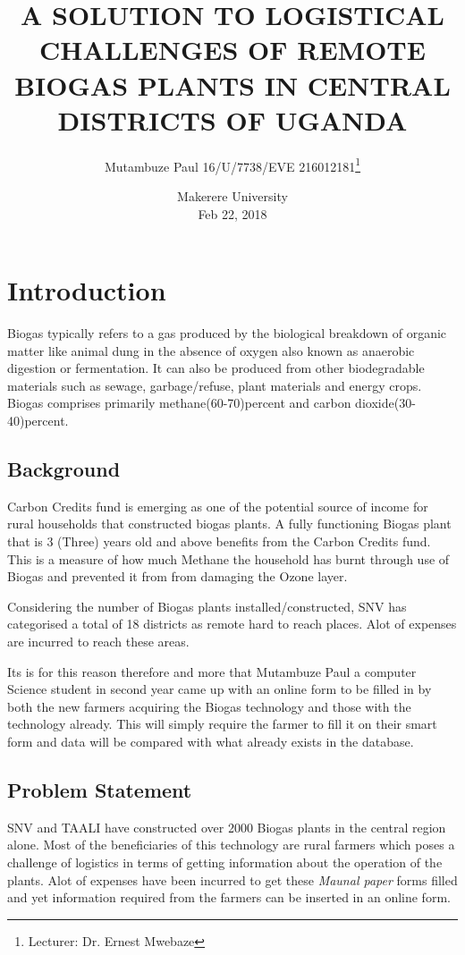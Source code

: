 \documentclass[options]{article}
\title{A SOLUTION TO LOGISTICAL CHALLENGES OF REMOTE BIOGAS PLANTS IN CENTRAL DISTRICTS OF UGANDA}
\author{Mutambuze Paul  16/U/7738/EVE  216012181\thanks{Lecturer: Dr. Ernest Mwebaze}}\newpage
\date{%
    Makerere University\\%
    Feb 22, 2018
}
\begin{document}
\begin{titlepage}
\maketitle
\end{titlepage}




\newpage
{} 
\section{\textbf{ Introduction}} 
Biogas typically refers to a gas produced by the biological breakdown of organic matter like animal dung 
in the absence of oxygen also known as anaerobic digestion or fermentation.
It can also be produced from other biodegradable materials such as sewage, 
garbage/refuse, plant materials and energy crops.
Biogas comprises primarily methane(60-70)percent and carbon dioxide(30-40)percent.


\subsection{\textbf{Background}}
Carbon Credits fund is emerging as one of the potential source of income for rural households that constructed 
biogas plants.
A fully functioning Biogas plant that is 3 (Three) years old and above benefits from the Carbon Credits fund.
This is a measure of
how much Methane the household has burnt through use of Biogas and prevented it from from damaging the Ozone layer.

\bigbreak

Considering the number of Biogas plants installed/constructed, SNV has categorised a total of 18 districts as 
remote hard to reach places. Alot of expenses are incurred to reach these areas.

\bigbreak
Its is for this reason therefore and more that Mutambuze Paul a computer Science student in
 second year came up with an online 
form to be filled in by both the new farmers acquiring the Biogas technology and those with the technology already.
This will simply require the farmer to fill it on their smart form and data will be compared with what already exists
in the database.


\subsection{\textbf{Problem Statement}}
SNV and TAALI have constructed over 2000 Biogas plants in the central region alone. Most of the beneficiaries of this technology
are rural farmers which poses a challenge of logistics in terms of getting information about the operation of the plants. Alot of 
expenses have been incurred to get these \textit{Maunal paper} forms filled and yet information required from the farmers can be inserted in an online form. 
\end{document}

